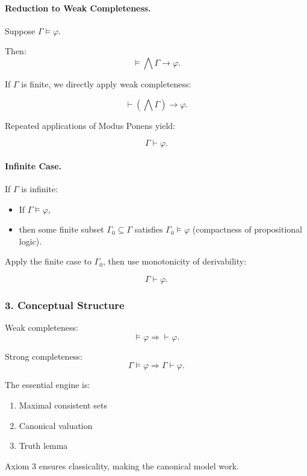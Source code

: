 \documentclass{article}
\begin{document}
{\paragraph{Reduction to Weak Completeness.}

Suppose $\Gamma \models \varphi$.

Then:
\[
\models \bigwedge \Gamma \to \varphi.
\]

If $\Gamma$ is finite, we directly apply weak completeness:

\[
\vdash (\bigwedge \Gamma) \to \varphi.
\]

Repeated applications of Modus Ponens yield:

\[
\Gamma \vdash \varphi.
\]

\paragraph{Infinite Case.}

If $\Gamma$ is infinite:

\begin{itemize}
    \item If $\Gamma \models \varphi$,
    \item then some finite subset $\Gamma_0 \subseteq \Gamma$
    satisfies $\Gamma_0 \models \varphi$
    (compactness of propositional logic).
\end{itemize}

Apply the finite case to $\Gamma_0$,
then use monotonicity of derivability:

\[
\Gamma \vdash \varphi.
\]

\bigskip
\subsubsection*{3. Conceptual Structure}

Weak completeness:
\[
\models \varphi \Rightarrow \vdash \varphi.
\]

Strong completeness:
\[
\Gamma \models \varphi \Rightarrow \Gamma \vdash \varphi.
\]

The essential engine is:

\begin{enumerate}
    \item Maximal consistent sets
    \item Canonical valuation
    \item Truth lemma
\end{enumerate}

Axiom 3 ensures classicality, making the canonical model work.

}
\end{document}
